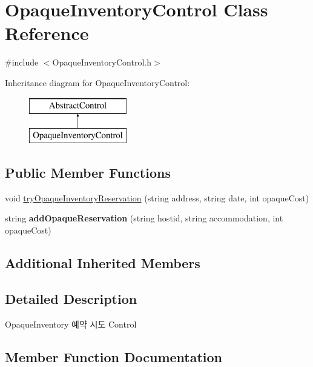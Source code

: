 \hypertarget{class_opaque_inventory_control}{}\section{Opaque\+Inventory\+Control Class Reference}
\label{class_opaque_inventory_control}


{\ttfamily \#include $<$Opaque\+Inventory\+Control.\+h$>$}

Inheritance diagram for Opaque\+Inventory\+Control\+:\begin{figure}[H]
\begin{center}
\leavevmode
\includegraphics[height=2.000000cm]{class_opaque_inventory_control}
\end{center}
\end{figure}
\subsection*{Public Member Functions}
\begin{DoxyCompactItemize}
\item 
void \mbox{\hyperlink{class_opaque_inventory_control_a671ed0b02c98801a5f568a710b8fc107}{try\+Opaque\+Inventory\+Reservation}} (string address, string date, int opaque\+Cost)
\item 
\mbox{\label{class_opaque_inventory_control_ab3db8bcd22d72ee5d34d7d435b6776ca}} 
string {\bfseries add\+Opaque\+Reservation} (string hostid, string accommodation, int opaque\+Cost)
\end{DoxyCompactItemize}
\subsection*{Additional Inherited Members}


\subsection{Detailed Description}
Opaque\+Inventory 예약 시도 Control 

\subsection{Member Function Documentation}
\mbox{\label{class_opaque_inventory_control_a671ed0b02c98801a5f568a710b8fc107}} 
